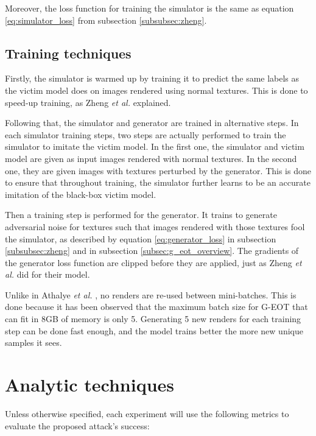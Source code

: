 Moreover, the loss function for training the simulator is the same as equation \ref{eq:simulator_loss} from subsection \ref{subsubsec:zheng}. 

\subsection{Training techniques}
    \label{subsec:training}

Firstly, the simulator is warmed up by training it to predict the same labels as the victim model does on images rendered using normal textures. This is done to speed-up training, as Zheng \textit{et al.} \cite{zheng_black_box_GAN} explained.

Following that, the simulator and generator are trained in alternative steps. In each simulator training steps, two steps are actually performed to train the simulator to imitate the victim model. In the first one, the simulator and victim model are given as input images rendered with normal textures. In the second one, they are given images with textures perturbed by the generator. This is done to ensure that throughout training, the simulator further learns to be an accurate imitation of the black-box victim model.

Then a training step is performed for the generator. It trains to generate adversarial noise for textures such that images rendered with those textures fool the simulator, as described by equation \ref{eq:generator_loss} in subsection \ref{subsubsec:zheng} and in subsection \ref{subsec:g_eot_overview}. The gradients of the generator loss function are clipped before they are applied, just as Zheng \textit{et al.} \cite{zheng_black_box_GAN} did for their model.

Unlike in Athalye \textit{et al.} \cite{athalye}, no renders are re-used between mini-batches. This is done because it has been observed that the maximum batch size for G-EOT that can fit in 8GB of memory is only 5. Generating 5 new renders for each training step can be done fast enough, and the model trains better the more new unique samples it sees.

\section{Analytic techniques}
    \label{sec:analytic_techniques}
    
Unless otherwise specified, each experiment will use the following metrics to evaluate the proposed attack's success:

